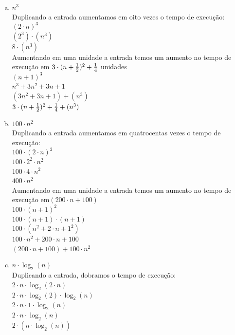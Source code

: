\documentclass[a4paper,10pt]{article}
\begin{document}
\begin{enumerate}
\begin{enumerate}[(a)]
\item $n^3$\\
Duplicando a entrada aumentamos em oito vezes o tempo de execução:\\
$(2 \cdot n)^3$\\
$(2^3) \cdot (n^3)$\\
$8 \cdot (n^3)$\\
Aumentando em uma unidade a entrada temos um aumento no tempo de execução 
em $3 \cdot (n + {1\over{2}} )^2 + {1\over{4}}$ unidades\\
$(n+1)^3$\\
$n^3+3n^2+3n+1$\\
$(3n^2+3n+1)+(n^3)$\\
$3 \cdot (n + {1\over{2}} )^2 + {1\over{4}}+(n^3)$\\

\item $100 \cdot n^2$\\
Duplicando a entrada aumentamos em quatrocentas vezes o tempo de execução:\\
$100 \cdot (2\cdot n)^2$\\
$100 \cdot 2^2 \cdot n^2$\\
$100 \cdot 4 \cdot n^2$\\
$400 \cdot n^2$\\

Aumentando em uma unidade a entrada temos um aumento no tempo de execução 
em$(200 \cdot n +100)$\\
$100 \cdot (n+1)^2$\\
$100 \cdot (n+1) \cdot (n+1)$\\
$100 \cdot (n^2+2 \cdot n+1^2)$\\
$100 \cdot n^2 + 200 \cdot n +100$\\
$(200 \cdot n +100) + 100 \cdot n^2$\\

\pagebreak

\item $n \cdot \log_2(n)$\\
Duplicando a entrada, dobramos o tempo de execução:\\
$2\cdot n \cdot \log_2(2\cdot n)$\\
$2\cdot n \cdot \log_2(2) \cdot \log_2(n)$\\
$2\cdot n \cdot 1 \cdot \log_2(n)$\\
$2\cdot n \cdot \log_2(n)$\\
$2\cdot (n \cdot \log_2(n))$\\


\end{enumerate}
\end{enumerate}
\end{document}
